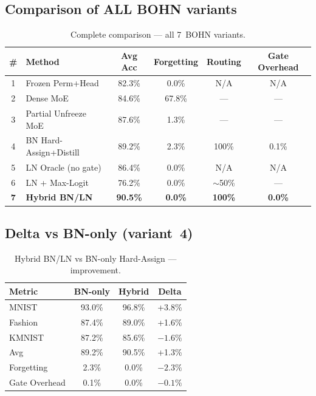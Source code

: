\documentclass[11pt,a4paper]{report}
\begin{document}
\subsection{Comparison of ALL BOHN variants}

\begin{table}[h]
\centering
\caption{Complete comparison --- all 7~BOHN variants.}
\begin{tabular}{c l c c c c}
\hline
\textbf{\#} & \textbf{Method} & \textbf{Avg Acc} & \textbf{Forgetting} & \textbf{Routing} & \textbf{Gate Overhead} \\
\hline
1 & Frozen Perm+Head & 82.3\% & 0.0\% & N/A & N/A \\
2 & Dense MoE & 84.6\% & 67.8\% & --- & --- \\
3 & Partial Unfreeze MoE & 87.6\% & 1.3\% & --- & --- \\
4 & BN Hard-Assign+Distill & 89.2\% & 2.3\% & 100\% & 0.1\% \\
5 & LN Oracle (no gate) & 86.4\% & 0.0\% & N/A & N/A \\
6 & LN + Max-Logit & 76.2\% & 0.0\% & $\sim$50\% & --- \\
\textbf{7} & \textbf{Hybrid BN/LN} & \textbf{90.5\%} & \textbf{0.0\%} & \textbf{100\%} & \textbf{0.0\%} \\
\hline
\end{tabular}
\end{table}

\subsection{Delta vs BN-only (variant~4)}

\begin{table}[h]
\centering
\caption{Hybrid BN/LN vs BN-only Hard-Assign --- improvement.}
\begin{tabular}{l c c c}
\hline
\textbf{Metric} & \textbf{BN-only} & \textbf{Hybrid} & \textbf{Delta} \\
\hline
MNIST & 93.0\% & 96.8\% & +3.8\% \\
Fashion & 87.4\% & 89.0\% & +1.6\% \\
KMNIST & 87.2\% & 85.6\% & $-1.6\%$ \\
Avg & 89.2\% & 90.5\% & +1.3\% \\
Forgetting & 2.3\% & 0.0\% & $-2.3\%$ \\
Gate Overhead & 0.1\% & 0.0\% & $-0.1\%$ \\
\hline
\end{tabular}
\end{table}
\end{document}
